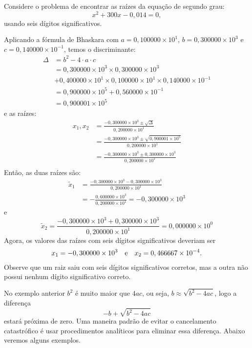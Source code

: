 \documentclass[main.tex]{subfiles}
\begin{document}
\begin{ex} Considere o problema de encontrar as raízes da equação de segundo grau:
  \begin{equation*}
    x^2+300x-0,014=0,
  \end{equation*}
usando seis dígitos significativos.

Aplicando a fórmula de Bhaskara com $a=0,100000\times 10^1$, $b=0,300000\times 10^3$ e $c=0,140000\times 10^{-1}$, temos o discriminante:
\begin{align*}
  \Delta &= b^2 - 4\cdot a\cdot c\\
  &=0,300000\times 10^3\times 0,300000\times 10^3 \\
  &+ 0,400000\times 10^1\times 0,100000\times 10^1\times 0,140000\times 10^{-1}\\
  &=0,900000\times 10^5 +0,560000\times  10^{-1}\\
  &=0,900001\times 10^5
\end{align*}
e as raízes:
\begin{align*}
x_1,x_2 &=\frac{-0,300000\times 10^3\pm \sqrt{\Delta}}{0,200000\times 10^1} \\
&=\frac{-0,300000\times 10^3\pm \sqrt{0,900001\times 10^5}}{0,200000\times 10^1} \\
&=\frac{-0,300000\times 10^3\pm 0,300000\times 10^3}{0,200000\times 10^1}\\
\end{align*}
Então, as duas raízes são:
\begin{align*}
  \tilde{x}_1 &= \frac{-0,300000\times 10^3- 0,300000\times 10^3}{0,200000\times 10^1}\\
  &=-\frac{0,600000\times 10^3}{0,200000\times 10^1}=-0,300000\times 10^3
\end{align*}
e
\begin{equation*}
\tilde{x}_2=\frac{-0,300000\times 10^3+ 0,300000\times 10^3}{0,200000\times 10^1}=0,000000\times 10^{0} 
\end{equation*}
Agora, os valores das raízes com seis dígitos significativos deveriam ser
\begin{equation*}
  x_1=-0,300000\times 10^{3}\quad\hbox{e}\quad x_2=0,466667\times 10^{-4}.  
\end{equation*}
Observe que um raiz saiu com seis dígitos significativos corretos, mas a outra não possui nenhum dígito significativo correto.
\end{ex}

\begin{obs}
No exemplo anterior $b^2$ é muito maior que $4ac$, ou seja, $b\approx \sqrt{b^2-4ac}$, logo a diferença
\begin{equation*}
  -b+\sqrt{b^2-4ac}
\end{equation*}
estará próxima de zero. Uma maneira padrão de evitar o cancelamento catastrófico é usar procedimentos analíticos para eliminar essa diferença. Abaixo veremos alguns exemplos.  
\end{obs}
\end{document}

